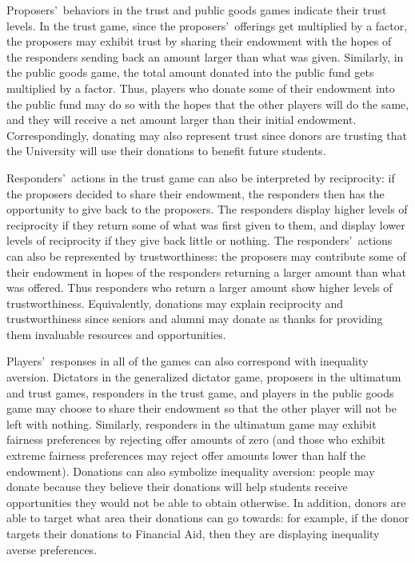 \documentclass[12pt]{article}
\begin{document}
Proposers\rq \ behaviors in the trust and public goods games indicate their trust levels. In the trust game, since the proposers\rq \ offerings get multiplied by a factor, the proposers may exhibit trust by sharing their endowment with the hopes of the responders sending back an amount larger than what was given. Similarly, in the public goods game, the total amount donated into the public fund gets multiplied by a factor. Thus, players who donate some of their endowment into the public fund may do so with the hopes that the other players will do the same, and they will receive a net amount larger than their initial endowment. Correspondingly, donating may also represent trust since donors are trusting that the University will use their donations to benefit future students.

Responders\rq \ actions in the trust game can also be interpreted by reciprocity: if the proposers decided to share their endowment, the responders then has the opportunity to give back to the proposers. The responders display higher levels of reciprocity if they return some of what was first given to them, and display lower levels of reciprocity if they give back little or nothing. The responders\rq \ actions can also be represented by trustworthiness: the proposers may contribute some of their endowment in hopes of the responders returning a larger amount than what was offered. Thus responders who return a larger amount show higher levels of trustworthiness. Equivalently, donations may explain reciprocity and trustworthiness since seniors and alumni may donate as thanks for providing them invaluable resources and opportunities.

Players\rq \ responses in all of the games can also correspond with inequality aversion. Dictators in the generalized dictator game, proposers in the ultimatum and trust games, responders in the trust game, and players in the public goods game may choose to share their endowment so that the other player will not be left with nothing. Similarly, responders in the ultimatum game may exhibit fairness preferences by rejecting offer amounts of zero (and those who exhibit extreme fairness preferences may reject offer amounts lower than half the endowment). Donations can also symbolize inequality aversion: people may donate because they believe their donations will help students receive opportunities they would not be able to obtain otherwise. In addition, donors are able to target what area their donations can go towards: for example, if the donor targets their donations to Financial Aid, then they are displaying inequality averse preferences.
\end{document}
